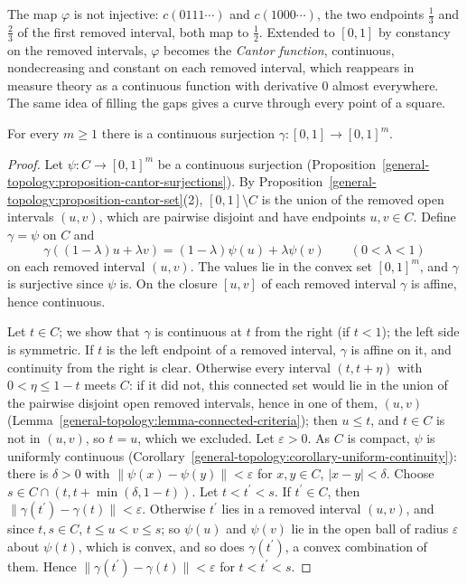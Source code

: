 The map $\varphi$ is not injective: $c(0111\cdots)$ and $c(1000\cdots)$, the two endpoints $\frac13$ and $\frac23$ of the first removed interval, both map to $\frac12$. Extended to $[0, 1]$ by
constancy on the removed intervals, $\varphi$ becomes the \emph{Cantor function}, continuous, nondecreasing and constant on each removed interval, which reappears in measure theory as a continuous function with
derivative $0$ almost everywhere. The same idea of filling the gaps gives a curve through every point of a square.

\begin{theorem}\label{general-topology:theorem-peano-curve}
For every $m \geq 1$ there is a continuous surjection $\gamma \colon [0, 1] \to [0, 1]^m$.
\end{theorem}

\begin{proof}
Let $\psi \colon C \to [0, 1]^m$ be a continuous surjection (Proposition~\ref{general-topology:proposition-cantor-surjections}). By Proposition~\ref{general-topology:proposition-cantor-set}(2), $[0, 1] \setminus C$
is the union of the removed open intervals $(u, v)$, which are pairwise disjoint and have endpoints $u, v \in C$. Define $\gamma = \psi$ on $C$ and
\[
\gamma((1 - \lambda)u + \lambda v) = (1 - \lambda)\psi(u) + \lambda\psi(v) \qquad (0 < \lambda < 1)
\]
on each removed interval $(u, v)$. The values lie in the convex set $[0, 1]^m$, and $\gamma$ is surjective since $\psi$ is. On the closure $[u, v]$ of each removed interval $\gamma$ is affine, hence continuous.

Let $t \in C$; we show that $\gamma$ is continuous at $t$ from the right (if $t < 1$); the left side is symmetric. If $t$ is the left endpoint of a removed interval, $\gamma$ is affine on it, and continuity from
the right is clear. Otherwise every interval $(t, t + \eta)$ with $0 < \eta \leq 1 - t$ meets $C$: if it did not, this connected set would lie in the union of the pairwise disjoint open removed intervals, hence in
one of them, $(u, v)$ (Lemma~\ref{general-topology:lemma-connected-criteria}); then $u \leq t$, and $t \in C$ is not in $(u, v)$, so $t = u$, which we excluded. Let $\varepsilon > 0$. As $C$ is compact, $\psi$ is uniformly continuous (Corollary~\ref{general-topology:corollary-uniform-continuity}):
there is $\delta > 0$ with $\|\psi(x) - \psi(y)\| < \varepsilon$ for $x, y \in C$, $|x - y| < \delta$. Choose $s \in C \cap (t, t + \min(\delta, 1 - t))$. Let $t < t^{\prime} < s$. If $t^{\prime} \in C$, then
$\|\gamma(t^{\prime}) - \gamma(t)\| < \varepsilon$. Otherwise $t^{\prime}$ lies in a removed interval $(u, v)$, and since $t, s \in C$, $t \leq u < v \leq s$; so $\psi(u)$ and $\psi(v)$ lie in the open ball of radius
$\varepsilon$ about $\psi(t)$, which is convex, and so does $\gamma(t^{\prime})$, a convex combination of them. Hence $\|\gamma(t^{\prime}) - \gamma(t)\| < \varepsilon$ for $t < t^{\prime} < s$.
\end{proof}

